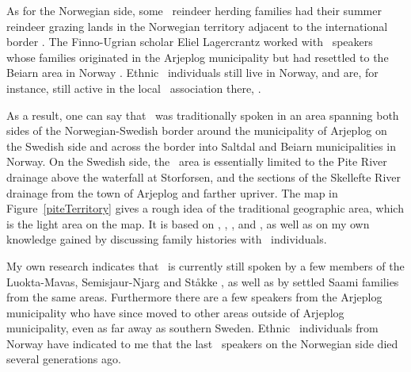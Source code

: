 As for the Norwegian side, some \PS\ reindeer herding families had their summer reindeer grazing lands in the Norwegian territory adjacent to the international border \cite[cf.][]{Manker1947}. The Finno-Ugrian scholar Eliel Lagercrantz worked with \PS\ speakers whose families originated in the Arjeplog municipality but had resettled to the Beiarn area in Norway \cite[cf.][]{Lagercrantz1926}. Ethnic \PS\ individuals still live in Norway, and are, for instance, still active in the local \PS\ association there, . 

As a result, one can say that \PS\ was traditionally spoken in an area spanning both sides of the Norwegian-Swedish border around the municipality of Arjeplog on the Swedish side and across the border into Saltdal and Beiarn municipalities in Norway. %
On the Swedish side, the \PS\ area is essentially limited to the Pite River %
drainage above the waterfall at Storforsen, and the sections of the Skellefte River %
drainage from the town of Arjeplog and farther upriver. %
The map in Figure~\vref{piteTerritory} gives a rough idea of the traditional geographic area, which is the light area on the map. It is based on  \citet{Lagercrantz1926}, \citet{Ruong1943}, \citet{Manker1947}, \citet{Bergsland1962} and \citet{Sammallahti1998}, as well as on my own knowledge gained by discussing family histories with \PS\ individuals.

My own research indicates that \PS\ is currently still spoken by a few members of the Luokta-Mavas, Semisjaur-Njarg and Ståkke , as well as by settled Saami families from the same areas. Furthermore there are a few speakers from the Arjeplog municipality who have since moved to other areas outside of Arjeplog municipality, %
even as far away as southern Sweden. %
Ethnic \PS\ individuals from Norway have indicated to me that the last \PS\ speakers on the Norwegian side died several generations ago.%

